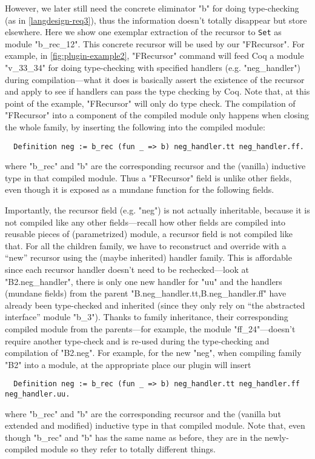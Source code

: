 However, we later still need the concrete eliminator "b" for doing type-checking (as in \ref{langdesign-req3}), thus the information doesn't totally disappear but store elsewhere.  Here we show one exemplar extraction of the recursor to \texttt{Set} as module "b_rec_12". This concrete recursor will be used by our "FRecursor". For example, in \cref{fig:plugin-example2}, "FRecursor" command will feed Coq a module "v_33_34" for doing type-checking with specified handlers (e.g. "neg_handler") during compilation---what it does is basically
assert the existence of the recursor and apply to see if handlers can
pass the type checking by Coq. Note that, at this point of the example, "FRecursor" will only do type check. The compilation of "FRecursor" into a component of the compiled module only happens when closing the whole family, by inserting the following into the compiled module: 
\begin{verbatim}
  Definition neg := b_rec (fun _ => b) neg_handler.tt neg_handler.ff.
\end{verbatim}
where "b_rec" and "b" are the corresponding recursor and the (vanilla) inductive type in that compiled module. Thus a "FRecursor" field is unlike other fields, even though it is exposed as a mundane function for the following fields.

Importantly, the recursor field (e.g. "neg") is not actually inheritable, because it is not compiled like any other fields---recall how other fields are compiled into reusable pieces of (parametrized) module, a recursor field is not compiled like that. For all the children family, we have to reconstruct and override with a ``new'' recursor using the (maybe inherited) handler family. This is affordable since each recursor handler doesn't need
to be rechecked---look at "B2.neg_handler", there is only one new
handler for "uu" and the handlers (mundane fields) from the parent
"B.neg_handler.tt,B.neg_handler.ff" have already been type-checked and
inherited (since they only rely on ``the abstracted
interface'' module "b_3"). 
Thanks to family inheritance, their corresponding compiled module from the parents---for example, 
the module "ff_24"---doesn't require another type-check and is re-used during the type-checking and compilation of "B2.neg". For example, for the new "neg", when compiling family "B2" into a module, at the appropriate place our plugin will insert
\begin{verbatim}
  Definition neg := b_rec (fun _ => b) neg_handler.tt neg_handler.ff neg_handler.uu.
\end{verbatim}
where "b_rec" and "b" are the corresponding recursor and the (vanilla but extended and modified) inductive type in that compiled module. Note that, even though "b_rec" and "b" has the same name as before, they are in the newly-compiled module so they refer to totally different things. 




